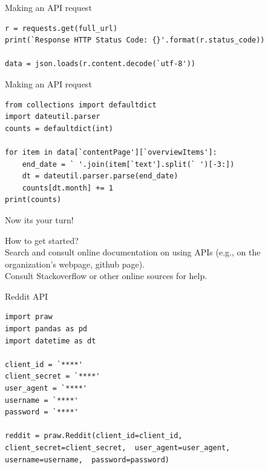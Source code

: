 \documentclass{beamer}
\begin{document}
\begin{frame}[fragile]{Making an API request}
\begin{lstlisting}
r = requests.get(full_url)
print(`Response HTTP Status Code: {}'.format(r.status_code))

data = json.loads(r.content.decode(`utf-8'))

\end{lstlisting}
\end{frame}


\begin{frame}[fragile]{Making an API request}
\begin{lstlisting}
from collections import defaultdict
import dateutil.parser
counts = defaultdict(int)

for item in data[`contentPage'][`overviewItems']:
    end_date = ` '.join(item[`text'].split(` ')[-3:])
    dt = dateutil.parser.parse(end_date)
    counts[dt.month] += 1
print(counts)

\end{lstlisting}
\end{frame}


\begin{frame}[fragile]{Now its your turn!}

How to get started? \\
Search and consult online documentation on using APIs (e.g., on the organization's webpage, github page). \\
Consult Stackoverflow or other online sources for help.

\end{frame}


\begin{frame}[fragile]{Reddit API}
\begin{lstlisting}
import praw
import pandas as pd
import datetime as dt

client_id = `****'
client_secret = `****'
user_agent = `****'
username = `****'
password = `****'

reddit = praw.Reddit(client_id=client_id,  client_secret=client_secret,  user_agent=user_agent,  username=username,  password=password)

\end{lstlisting}
\end{frame}
\end{document}
